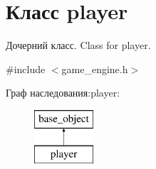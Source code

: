 \hypertarget{classplayer}{}\section{Класс player}
\label{classplayer}


Дочерний класс. Class for player.  




{\ttfamily \#include $<$game\+\_\+engine.\+h$>$}

Граф наследования\+:player\+:\begin{figure}[H]
\begin{center}
\leavevmode
\includegraphics[height=2.000000cm]{classplayer}
\end{center}
\end{figure}
